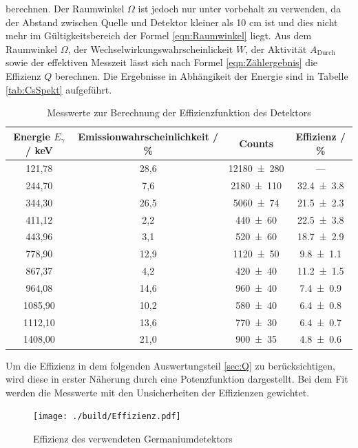 berechnen. Der Raumwinkel $\Omega$ ist jedoch nur unter vorbehalt zu verwenden, da der Abstand zwischen Quelle und Detektor kleiner als 10 cm ist und dies nicht mehr im Gültigkeitsbereich der Formel \ref{eqn:Raumwinkel} liegt. Aus dem Raumwinkel $\Omega$, der Wechselwirkungswahrscheinlickeit $W$, der Aktivität $A_\text{Durch}$ sowie der effektiven Messzeit lässt sich nach Formel \ref{eqn:Zählergebnis} die Effizienz $Q$ berechnen. Die Ergebnisse in Abhängikeit der Energie sind in Tabelle \ref{tab:CsSpekt} aufgeführt.
\begin{table}
  \centering
  \begin{tabular}{c| c c c}
     \toprule
    	Energie $E_{\gamma}$ / keV& Emissionwahrscheinlichkeit / \% \cite{V18}& Counts & Effizienz / \% \\
     \midrule
     121,78  &28,6 &\num{12180 +- 280} 	& ---	\\
     244,70  &7,6  &\num{2180 +- 110} 	& \num{32,4 +- 3,8}	\\
     344,30  &26,5 &\num{5060 +- 74} 	& \num{21,5 +- 2,3} 	\\
     411,12  &2,2  &\num{440 +- 60} 	& \num{22,5 +- 3,8} 	\\
     443,96  &3,1  &\num{520 +- 60} 	& \num{18,7 +- 2,9} 	\\
     778,90  &12,9 &\num{1120 +- 50}	& \num{9,8 +- 1,1}	\\
     867,37  &4,2  &\num{420 +- 40} 	& \num{11,2 +- 1,5}	\\
     964,08  &14,6 &\num{960 +- 40} 	& \num{7,4 +- 0,9}	\\
     1085,90 &10,2 &\num{580 +- 40} 	& \num{6,4 +- 0,8}	\\
     1112,10 &13,6 &\num{770 +- 30} 	& \num{6,4 +- 0,7}	\\
     1408,00 &21,0 &\num{900 +- 35} 	& \num{4,8 +- 0,6}	\\
     \bottomrule
  \end{tabular}
  \caption{Messwerte zur Berechnung der Effizienzfunktion des Detektors}
  \label{tab:Effi}
\end{table}

Um die Effizienz in dem folgenden Auswertungsteil \ref{sec:Q} zu berücksichtigen, wird diese in erster Näherung durch eine Potenzfunktion dargestellt. Bei dem Fit werden die Messwerte mit den Unsicherheiten der Effizienzen gewichtet.

\begin{figure}[H]
  \centering
  \texttt{[image: ./build/Effizienz.pdf]}
  \caption{Effizienz des verwendeten Germaniumdetektors}
  \label{fig:Efi}
\end{figure}

